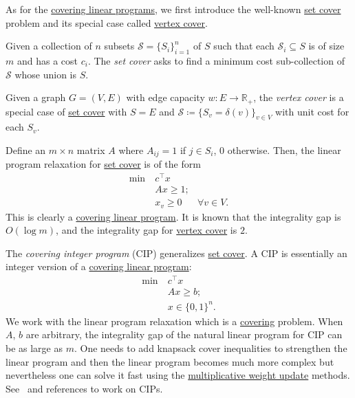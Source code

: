 As for the \hyperref[def:covering-LP]{covering linear programs}, we first introduce the well-known \hyperref[prb:set-cover]{set cover} problem and its special case called \hyperref[prb:vertex-cover]{vertex cover}.

\begin{problem}\label{prb:set-cover}
Given a collection of \(n\) subsets \(\mathcal{S} = \{ S_i \} _{i=1}^{n}\) of \(S\) such that each \(\mathcal{S} _i \subseteq S\) is of size \(m\) and has a cost \(c_i\). The \emph{set cover} asks to find a minimum cost sub-collection of \(\mathcal{S} \) whose union is \(S\).
\end{problem}

\begin{problem}\label{prb:vertex-cover}
Given a graph \(G = (V, E)\) with edge capacity \(w \colon E \to \mathbb{R} _{+}\), the \emph{vertex cover} is a special case of \hyperref[prb:set-cover]{set cover} with \(S = E\) and \(\mathcal{S} \coloneqq \{ S_v = \delta (v)\} _{v \in V}\) with unit cost for each \(S_v\).
\end{problem}

\begin{eg}
	Define an \(m \times n\) matrix \(A\) where \(A_{ij} = 1\) if \(j \in S_i\), \(0\) otherwise. Then, the linear program relaxation for \hyperref[prb:set-cover]{set cover} is of the form
	\[
		\begin{aligned}
			\min~ & c^{\top} x                      \\
			      & Ax \geq 1 ;                     \\
			      & x_v \geq 0  & \forall  v \in V.
		\end{aligned}
	\]
	This is clearly a \hyperref[def:covering-LP]{covering linear program}. It is known that the integrality gap is \(O(\log m)\), and the integrality gap for \hyperref[prb:vertex-cover]{vertex cover} is \(2\).
\end{eg}

\begin{eg}
	The \emph{covering integer program} (CIP) generalizes \hyperref[prb:set-cover]{set cover}. A CIP is essentially an integer version of a \hyperref[def:covering-LP]{covering linear program}:
	\[
		\begin{aligned}
			\min~ & c^{\top} x           \\
			      & Ax \geq b ;          \\
			      & x \in \{ 0, 1 \} ^n.
		\end{aligned}
	\]
	We work with the linear program relaxation which is a \hyperref[def:covering-LP]{covering} problem. When \(A\), \(b\) are arbitrary, the integrality gap of the natural linear program for CIP can be as large as \(m\). One needs to add knapsack cover inequalities to strengthen the linear program and then the linear program becomes much more complex but nevertheless one can solve it fast using the \hyperref[algo:MWU-discrete-non-uniform]{multiplicative weight update} methods. See~\cite{chekuri2019approximating} and references to work on CIPs.
\end{eg}

